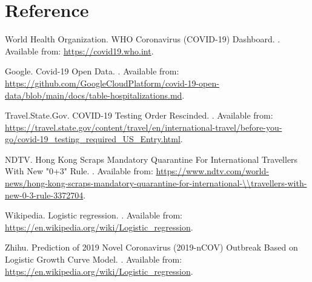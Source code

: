 \documentclass[12pt]{article}
\begin{document}
	\section*{Reference}
	\begin{thebibliography}{99}
		
	World Health Organization.
	\newblock WHO Coronavirus (COVID-19) Dashboard.
	.
	\newblock Available from: \url{https://covid19.who.int}.
	
	Google.
	\newblock Covid-19 Open Data.
	.
	\newblock Available from: \url{https://github.com/GoogleCloudPlatform/covid-19-open-data/blob/main/docs/table-hospitalizations.md}.
	
	Travel.State.Gov.
	\newblock COVID-19 Testing Order Rescinded.
	.
	\newblock Available from: \url{https://travel.state.gov/content/travel/en/international-travel/before-you-go/covid-19_testing_required_US_Entry.html}.
	
	NDTV.
	\newblock Hong Kong Scraps Mandatory Quarantine For International Travellers With New "0+3" Rule.
	.
	\newblock Available from: \url{https://www.ndtv.com/world-news/hong-kong-scraps-mandatory-quarantine-for-international-\\travellers-with-new-0-3-rule-3372704}.
	
	Wikipedia.
	\newblock Logistic regression.
	.
	\newblock Available from: \url{https://en.wikipedia.org/wiki/Logistic_regression}.
	
	
	Zhihu.
	\newblock Prediction of 2019 Novel Coronavirus (2019-nCOV) Outbreak Based on Logistic Growth Curve Model.
	.
	\newblock Available from: \url{https://en.wikipedia.org/wiki/Logistic_regression}.
		
	\end{thebibliography}
\end{document}
